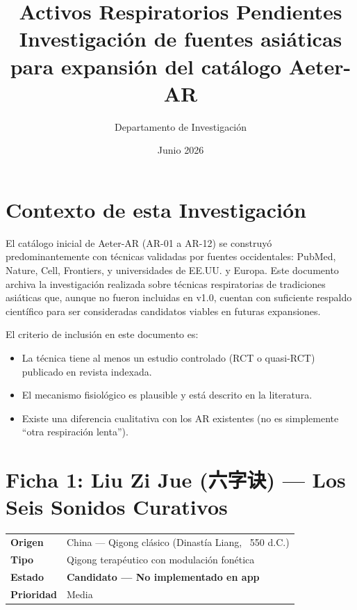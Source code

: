 \documentclass[12pt,a4paper]{article}
\begin{document}
\title{
    \vspace{-1.5cm}
    {\LARGE\textbf{Activos Respiratorios Pendientes}}\\[0.3cm]
    {\large Investigación de fuentes asiáticas para expansión del catálogo Aeter-AR}
}
\author{Departamento de Investigación}
\date{Junio 2026}
\maketitle
\thispagestyle{fancy}

\section{Contexto de esta Investigación}

El catálogo inicial de Aeter-AR (AR-01 a AR-12) se construyó predominantemente
con técnicas validadas por fuentes occidentales: PubMed, Nature, Cell,
Frontiers, y universidades de EE.UU. y Europa. Este documento archiva la
investigación realizada sobre técnicas respiratorias de tradiciones asiáticas
que, aunque no fueron incluidas en v1.0, cuentan con suficiente respaldo
científico para ser consideradas candidatos viables en futuras expansiones.

El criterio de inclusión en este documento es:
\begin{itemize}
    \item La técnica tiene al menos un estudio controlado (RCT o quasi-RCT)
          publicado en revista indexada.
    \item El mecanismo fisiológico es plausible y está descrito en la
          literatura.
    \item Existe una diferencia cualitativa con los AR existentes (no es
          simplemente ``otra respiración lenta'').
\end{itemize}

\section{Ficha 1: Liu Zi Jue (六字诀) — Los Seis Sonidos Curativos}

\begin{tabularx}{\textwidth}{ll}
    \toprule
    \textbf{Origen} & China — Qigong clásico (Dinastía Liang, ~550 d.C.) \\
    \textbf{Tipo} & Qigong terapéutico con modulación fonética \\
    \textbf{Estado} & \textbf{Candidato — No implementado en app} \\
    \textbf{Prioridad} & Media \\
    \bottomrule
\end{tabularx}
\end{document}
